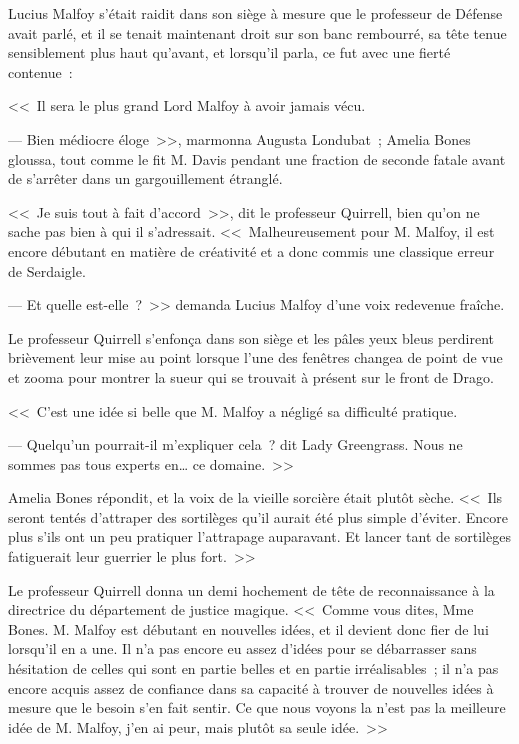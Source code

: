 Lucius Malfoy s'était raidit dans son siège à mesure que le professeur de Défense avait parlé, et il se tenait maintenant droit sur son banc rembourré, sa tête tenue sensiblement plus haut qu'avant, et lorsqu'il parla, ce fut avec une fierté contenue~:

<<~Il sera le plus grand Lord Malfoy à avoir jamais vécu.

--- Bien médiocre éloge~>>, marmonna Augusta Londubat~; Amelia Bones gloussa, tout comme le fit M. Davis pendant une fraction de seconde fatale avant de s'arrêter dans un gargouillement étranglé.

<<~Je suis tout à fait d'accord~>>, dit le professeur Quirrell, bien qu'on ne sache pas bien à qui il s'adressait. <<~Malheureusement pour M. Malfoy, il est encore débutant en matière de créativité et a donc commis une classique erreur de Serdaigle.

--- Et quelle est-elle~?~>> demanda Lucius Malfoy d'une voix redevenue fraîche.

Le professeur Quirrell s'enfonça dans son siège et les pâles yeux bleus perdirent brièvement leur mise au point lorsque l'une des fenêtres changea de point de vue et zooma pour montrer la sueur qui se trouvait à présent sur le front de Drago.

<<~C'est une idée si belle que M. Malfoy a négligé sa difficulté pratique.

--- Quelqu'un pourrait-il m'expliquer cela~? dit Lady Greengrass. Nous ne sommes pas tous experts en… ce domaine.~>>

Amelia Bones répondit, et la voix de la vieille sorcière était plutôt sèche. <<~Ils seront tentés d'attraper des sortilèges qu'il aurait été plus simple d'éviter. Encore plus s'ils ont un peu pratiquer l'attrapage auparavant. Et lancer tant de sortilèges fatiguerait leur guerrier le plus fort.~>>

Le professeur Quirrell donna un demi hochement de tête de reconnaissance à la directrice du département de justice magique. <<~Comme vous dites, Mme Bones. M. Malfoy est débutant en nouvelles idées, et il devient donc fier de lui lorsqu'il en a une. Il n'a pas encore eu assez d'idées pour se débarrasser sans hésitation de celles qui sont en partie belles et en partie irréalisables~; il n'a pas encore acquis assez de confiance dans sa capacité à trouver de nouvelles idées à mesure que le besoin s'en fait sentir. Ce que nous voyons la n'est pas la meilleure idée de M. Malfoy, j'en ai peur, mais plutôt sa seule idée.~>>

